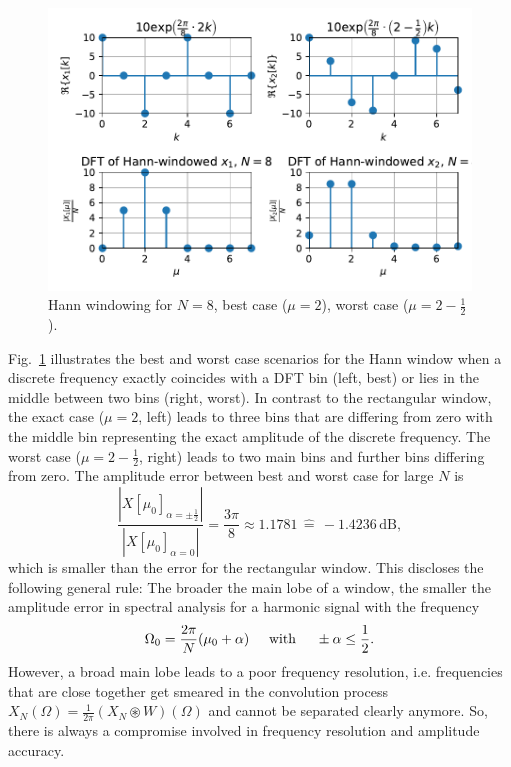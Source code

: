 \documentclass[11pt,a4paper,DIV=12]{scrartcl}
\begin{document}
\begin{figure}
		\centering
		\includegraphics[]{graphics/DFTbestworstcase_HannWin.pdf}
		\caption{Hann windowing for $N=8$, best case ($\mu=2$), worst case ($\mu=2-\frac{1}{2}$).}
		\label{DFTbestworstcase_HannWin}
\end{figure}

Fig.~\ref{DFTbestworstcase_HannWin} illustrates the best and worst case
scenarios for the Hann window when a discrete frequency exactly coincides
with a DFT bin (left, best) or lies in the middle between two bins (right, worst).
%
In contrast to the rectangular window, the exact case ($\mu=2$, left) leads to
three bins that are differing from zero with the middle bin representing the
exact amplitude of the discrete frequency.
%
The worst case ($\mu=2-\frac{1}{2}$, right) leads to two main bins and further
bins differing from zero.
%
The amplitude error between best and worst case for large $N$ is
%
\begin{equation}
\frac{\left|X[\mu_0]_{\alpha=\pm\frac{1}{2}}\right|}{\left|X[\mu_0]_{\alpha=0}\right|}=\frac{3\pi}{8}\approx1.1781\,\hat{=}\,-1.4236\,\text{dB},
\end{equation}
%
which is smaller than the error for the rectangular window.
%
This discloses the following general rule: The broader the main lobe of a window,
the smaller the amplitude error in spectral analysis for a harmonic signal with
the frequency
%
\begin{equation}
\Omega_0=\frac{2\pi}{N}(\mu_0+\alpha) \hspace{5mm} \text{with} \hspace{5mm} \pm\alpha\leq\frac{1}{2}.
\end{equation}
%
However, a broad main lobe leads to a poor frequency resolution, i.e.
frequencies that are close together get smeared in the convolution process
$X_N(\Omega)=\frac{1}{2\pi}(X_N\circledast W)(\Omega)$ and cannot be separated
clearly anymore. So, there is always a compromise involved in frequency
resolution and amplitude accuracy.
\end{document}

